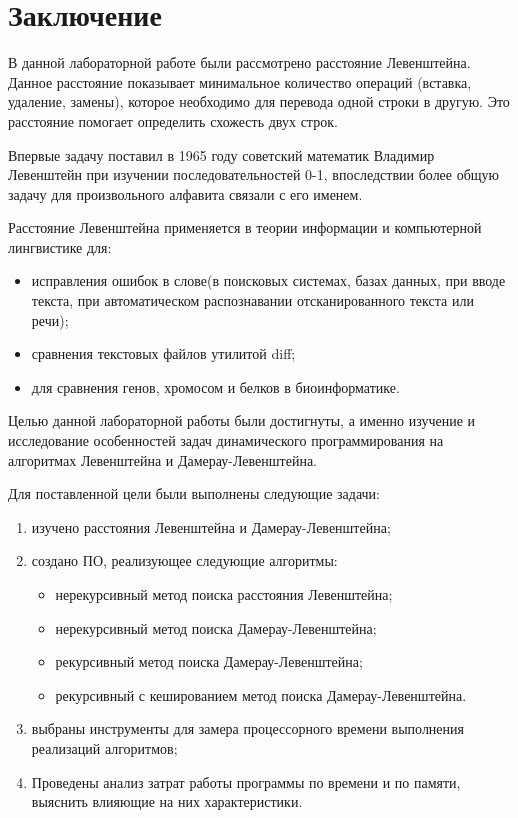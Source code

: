 \chapter*{Заключение}
В данной лабораторной работе были рассмотрено расстояние Левенштейна. Данное расстояние показывает минимальное количество операций (вставка, удаление, замены), которое необходимо для перевода одной строки в другую. Это расстояние помогает определить схожесть двух строк.

Впервые задачу поставил в 1965 году советский математик Владимир Левенштейн при изучении последовательностей 0-1, впоследствии более общую задачу для произвольного алфавита связали с его именем.

Расстояние Левенштейна применяется в теории информации и компьютерной лингвистике для:
\begin{itemize}
	\item исправления ошибок в слове(в поисковых системах, базах данных, при вводе текста, при автоматическом распознавании отсканированного текста или речи);
	\item сравнения текстовых файлов утилитой diff;
	\item для сравнения генов, хромосом и белков в биоинформатике.
\end{itemize}

Целью данной лабораторной работы были достигнуты, а именно изучение и исследование особенностей задач динамического программирования на алгоритмах Левенштейна и Дамерау-Левенштейна.

Для поставленной цели были выполнены следующие задачи:
\begin{enumerate}[label={\arabic*)}]
	\item изучено расстояния Левенштейна и Дамерау-Левенштейна;
	\item создано ПО, реализующее следующие алгоритмы:
	\begin{itemize}
		\item нерекурсивный метод поиска расстояния Левенштейна;
		\item нерекурсивный метод поиска Дамерау-Левенштейна;
		\item рекурсивный метод поиска Дамерау-Левенштейна;
		\item  рекурсивный с кешированием метод поиска Дамерау-Левенштейна.
	\end{itemize}
	\item выбраны инструменты для замера процессорного времени выполнения реализаций алгоритмов;
	\item Проведены анализ затрат работы программы по времени и по памяти, выяснить влияющие на них характеристики.
\end{enumerate}